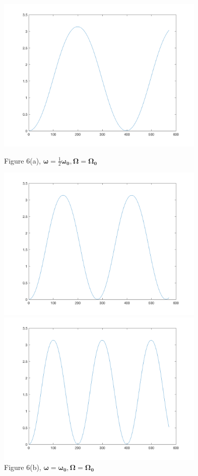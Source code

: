 \documentclass[12pt]{article}
\renewcommand{\(}{\left (}
\renewcommand{\)}{\right )}
\renewcommand{\vec}[1]{\boldsymbol{#1}}
\begin{document}
\begin{figure}[ht]
	\begin{minipage}{0.33\textwidth}
		\centering
		\includegraphics[width=0.89\textwidth]{L5000.png}
		\caption*{\small Figure 6(a), $\vec{\omega} = \frac{1}{2}\vec{\omega_0}, \vec{\Omega} = \vec{\Omega_0}$}
	\end{minipage}
	\begin{minipage}{0.33\textwidth}
		\centering
		\includegraphics[width=0.89\textwidth]{L10000.png}
		\caption*{\small Figure 6(b), $\vec{\omega} = \vec{\omega_0}, \vec{\Omega} = \vec{\Omega_0}$}
	\end{minipage}
	\begin{minipage}{0.33\textwidth}
		\centering
		\includegraphics[width=0.89\textwidth]{L20000.png}

\end{minipage}
\end{figure}
\end{document}
